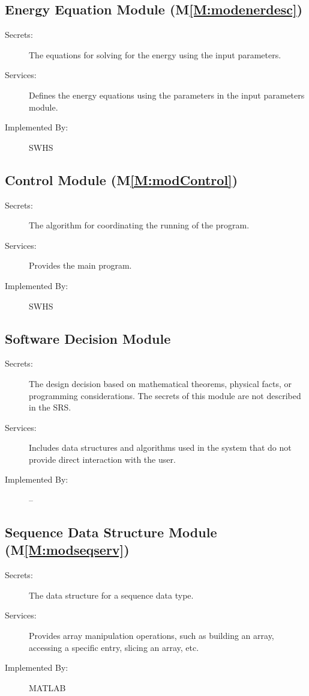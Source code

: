 \documentclass[12pt]{article}
\begin{document}
\subsection{Energy Equation Module (M\ref{M:modenerdesc})}
\label{Sec:EnerEquaModu()}
\begin{description}
\item[Secrets:]The equations for solving for the energy using the input parameters.
\item[Services:]Defines the energy equations using the parameters in the input parameters module.
\item[Implemented By:]SWHS
\end{description}
\subsection{Control Module (M\ref{M:modControl})}
\label{Sec:ContModu()}
\begin{description}
\item[Secrets:]The algorithm for coordinating the running of the program.
\item[Services:]Provides the main program.
\item[Implemented By:]SWHS
\end{description}
\subsection{Software Decision Module}
\label{Sec:SoftDeciModu}
\begin{description}
\item[Secrets:]The design decision based on mathematical theorems, physical facts, or programming considerations. The secrets of this module are not described in the SRS.
\item[Services:]Includes data structures and algorithms used in the system that do not provide direct interaction with the user.
\item[Implemented By:]--
\end{description}
\subsection{Sequence Data Structure Module (M\ref{M:modseqserv})}
\label{Sec:SequDataStruModu()}
\begin{description}
\item[Secrets:]The data structure for a sequence data type.
\item[Services:]Provides array manipulation operations, such as building an array, accessing a specific entry, slicing an array, etc.
\item[Implemented By:]MATLAB
\end{description}
\end{document}
